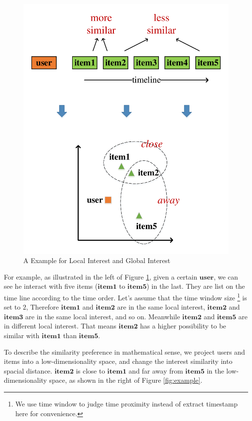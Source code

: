 \documentclass{sig-alternate-05-2015}
\begin{document}
\begin{figure}[htbp]
	\centering
	\includegraphics[scale=0.6]{images/embedding.pdf}
	\caption{A Example for Local Interest and Global Interest}
	\label{fig:embedding}
\end{figure}

For example, as illustrated in the left of Figure \ref{fig:embedding},
given a certain $\mathbf{user}$, we can see he interact with five items
($\mathbf{item1}$ to $\mathbf{item5}$) in the last.
They are list on the time line according to the time order.
Let's assume that the time window size \footnote{We use time window to judge time proximity
instead of extract timestamp here for convenience.} is set to $2$,
Therefore $\mathbf{item1}$ and $\mathbf{item2}$ are in the same local interest,
$\mathbf{item2}$ and $\mathbf{item3}$ are in the same local interest, and so on.
Meanwhile $\mathbf{item2}$ and $\mathbf{item5}$ are in different local interest.
That means $\mathbf{item2}$ has a higher possibility to be similar with $\mathbf{item1}$
than $\mathbf{item5}$.

To describe the similarity preference in mathematical sense,
we project users and items into a low-dimensionality space,
and change the interest similarity into spacial distance.
$\mathbf{item2}$ is close to $\mathbf{item1}$ and far away from $\mathbf{item5}$
in the low-dimensionality space, as shown in the right of Figure \ref{fig:example}.
\end{document}
